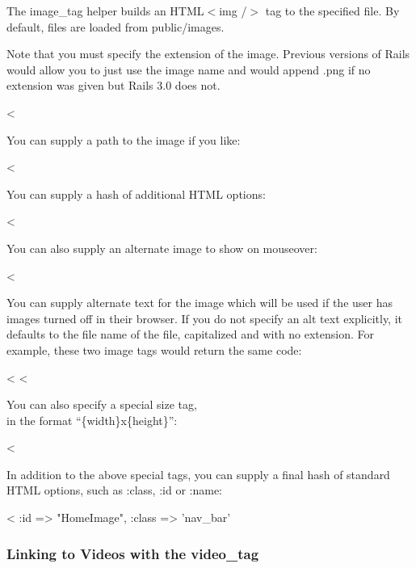 \documentclass[10pt]{book}
\newenvironment{code}{%
  \scriptsize
    \verbatim
}{%
    \endverbatim
    \newline
}
\begin{document}
The image\_tag helper builds an HTML$<$img /$>$ tag to the specified file. By default, files are loaded from public/images.

Note that you must specify the extension of the  image. Previous versions of Rails would allow you to just use the image  name and would append .png if no extension was given but Rails 3.0 does not.
\begin{code}
<%
\end{code}

You can supply a path to the image if you like:
\begin{code}
<%
\end{code}

You can supply a hash of additional HTML options:
\begin{code}
<%
\end{code}

You can also supply an alternate image to show on mouseover:
\begin{code}
<%
\end{code}

You can supply alternate text for the image which will be used if the  user has images turned off in their browser. If you do not specify an  alt text explicitly, it defaults to the file name of the file,  capitalized and with no extension. For example, these two image tags  would return the same code:
\begin{code}
<%
<%
\end{code}

You can also specify a special size tag, \\ in the format “\{width\}x\{height\}”:
\begin{code}
<%
\end{code}

In addition to the above special tags, you can supply a final hash of standard HTML options, such as :class, :id or :name:
\begin{code}
<%
                          :id => "HomeImage",
                          :class => 'nav_bar' %
\end{code}

\subsubsection{ Linking to Videos with the video\_tag}
\end{document}
